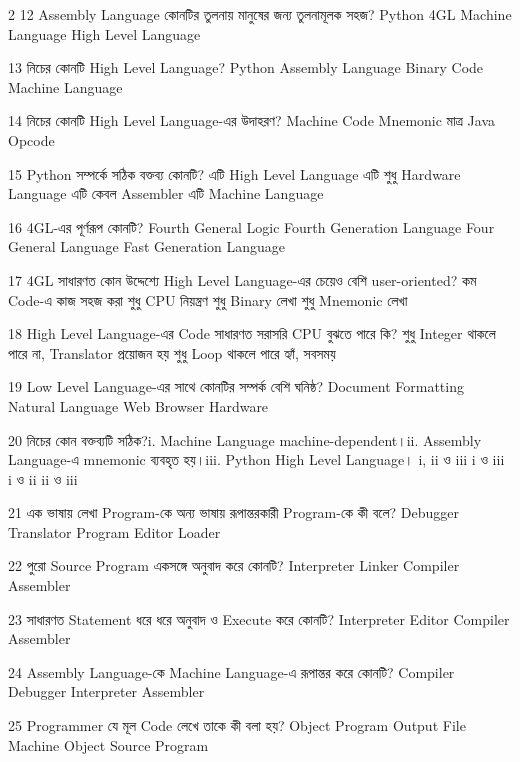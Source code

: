 \begin{multicols}{2}
\mcq
{12}
{Assembly Language কোনটির তুলনায় মানুষের জন্য তুলনামূলক সহজ?}
{Python}
{4GL}
{Machine Language}
{High Level Language}

\mcq
{13}
{নিচের কোনটি High Level Language?}
{Python}
{Assembly Language}
{Binary Code}
{Machine Language}

\mcq
{14}
{নিচের কোনটি High Level Language-এর উদাহরণ?}
{Machine Code}
{Mnemonic মাত্র}
{Java}
{Opcode}

\mcqwide
{15}
{Python সম্পর্কে সঠিক বক্তব্য কোনটি?}
{এটি High Level Language}
{এটি শুধু Hardware Language}
{এটি কেবল Assembler}
{এটি Machine Language}

\mcqwide
{16}
{4GL-এর পূর্ণরূপ কোনটি?}
{Fourth General Logic}
{Fourth Generation Language}
{Four General Language}
{Fast Generation Language}

\mcq
{17}
{4GL সাধারণত কোন উদ্দেশ্যে High Level Language-এর চেয়েও বেশি user-oriented?}
{কম Code-এ কাজ সহজ করা}
{শুধু CPU নিয়ন্ত্রণ}
{শুধু Binary লেখা}
{শুধু Mnemonic লেখা}

\mcqwide
{18}
{High Level Language-এর Code সাধারণত সরাসরি CPU বুঝতে পারে কি?}
{শুধু Integer থাকলে পারে}
{না, Translator প্রয়োজন হয়}
{শুধু Loop থাকলে পারে}
{হ্যাঁ, সবসময়}

\mcq
{19}
{Low Level Language-এর সাথে কোনটির সম্পর্ক বেশি ঘনিষ্ঠ?}
{Document Formatting}
{Natural Language}
{Web Browser}
{Hardware}

\mcqwide
{20}
{নিচের কোন বক্তব্যটি সঠিক?\newline i. Machine Language machine-dependent।\newline ii. Assembly Language-এ mnemonic ব্যবহৃত হয়।\newline iii. Python High Level Language।}
{i, ii ও iii}
{i ও iii}
{i ও ii}
{ii ও iii}

\mcq
{21}
{এক ভাষায় লেখা Program-কে অন্য ভাষায় রূপান্তরকারী Program-কে কী বলে?}
{Debugger}
{Translator Program}
{Editor}
{Loader}

\mcq
{22}
{পুরো Source Program একসঙ্গে অনুবাদ করে কোনটি?}
{Interpreter}
{Linker}
{Compiler}
{Assembler}

\mcq
{23}
{সাধারণত Statement ধরে ধরে অনুবাদ ও Execute করে কোনটি?}
{Interpreter}
{Editor}
{Compiler}
{Assembler}

\mcq
{24}
{Assembly Language-কে Machine Language-এ রূপান্তর করে কোনটি?}
{Compiler}
{Debugger}
{Interpreter}
{Assembler}

\mcq
{25}
{Programmer যে মূল Code লেখে তাকে কী বলা হয়?}
{Object Program}
{Output File}
{Machine Object}
{Source Program}


\end{multicols}
